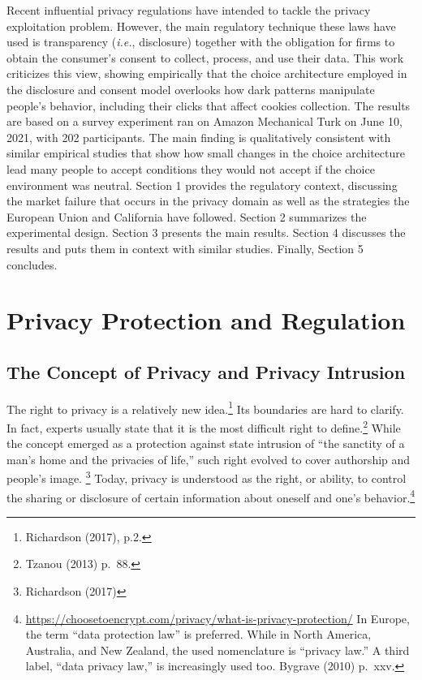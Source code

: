 \documentclass[
  11pt,
  letterpaper,
]{article}
\begin{document}
Recent influential privacy regulations have intended to tackle the privacy exploitation problem. However, the main regulatory technique these laws have used is transparency (\emph{i.e.}, disclosure) together with the obligation for firms to obtain the consumer's consent to collect, process, and use their data. This work criticizes this view, showing empirically that the choice architecture employed in the disclosure and consent model overlooks how dark patterns manipulate people's behavior, including their clicks that affect cookies collection. The results are based on a survey experiment ran on Amazon Mechanical Turk on June 10, 2021, with 202 participants. The main finding is qualitatively consistent with similar empirical studies that show how small changes in the choice architecture lead many people to accept conditions they would not accept if the choice environment was neutral. Section 1 provides the regulatory context, discussing the market failure that occurs in the privacy domain as well as the strategies the European Union and California have followed. Section 2 summarizes the experimental design. Section 3 presents the main results. Section 4 discusses the results and puts them in context with similar studies. Finally, Section 5 concludes. ~

\hypertarget{privacy-protection-and-regulation}{%
\section{Privacy Protection and Regulation}\label{privacy-protection-and-regulation}}

\hypertarget{the-concept-of-privacy-and-privacy-intrusion}{%
\subsection{The Concept of Privacy and Privacy Intrusion}\label{the-concept-of-privacy-and-privacy-intrusion}}

The right to privacy is a relatively new idea.\footnote{Richardson (2017), p.2.} Its boundaries are hard to clarify. In fact, experts usually state that it is the most difficult right to define.\footnote{Tzanou (2013) p.~88.} While the concept emerged as a protection against state intrusion of ``the sanctity of a man's home and the privacies of life,'' such right evolved to cover authorship and people's image. \footnote{Richardson (2017)} Today, privacy is understood as the right, or ability, to control the sharing or disclosure of certain information about oneself and one's behavior.\footnote{\url{https://choosetoencrypt.com/privacy/what-is-privacy-protection/} In Europe, the term ``data protection law'' is preferred. While in North America, Australia, and New Zealand, the used nomenclature is ``privacy law.'' A third label, ``data privacy law,'' is increasingly used too. Bygrave (2010) p.~xxv.}
\end{document}
